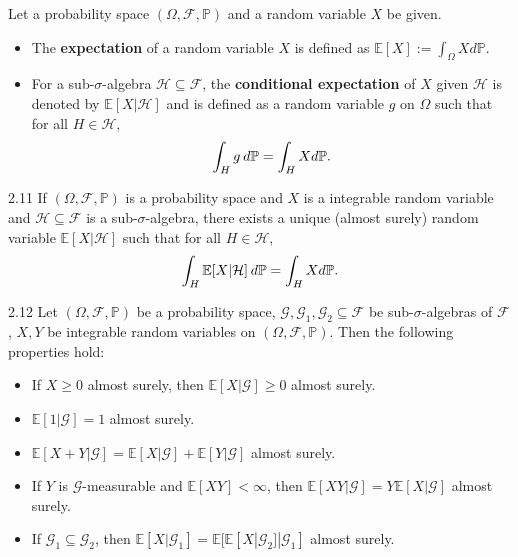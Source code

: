 \documentclass[10pt]{article}
\newenvironment{theorem*}[1]{%
  \IfBlankTF{#1}
    {\renewcommand{\themanualtheoreminner}{\unskip}}
    {\renewcommand\themanualtheoreminner{#1}}%
  \manualtheoreminner
}{\endmanualtheoreminner}
\theoremstyle{definition}
\newenvironment{definition*}[1]{%
  \IfBlankTF{#1}
    {\renewcommand{\themanualdefinitioninner}{\unskip}}
    {\renewcommand\themanualdefinitioninner{#1}}%
  \manualdefinitioninner
}{\endmanualdefinitioninner}
\begin{document}
\begin{definition*}{}Let a probability space $(\Omega, \mathcal{F}, \mathbb{P})$ and a random variable $X$ be given.
    \leavevmode
    \begin{itemize}
        \item The \textbf{expectation} of a random variable $X$ is defined as $\mathbb{E}[X] := \int_{\Omega} X d\mathbb{P}$.
        \item For a sub-$\sigma$-algebra $\mathcal{H} \subseteq \mathcal{F}$, the \textbf{conditional expectation} of $X$ given $\mathcal{H}$ is denoted by $\mathbb{E}[X|\mathcal{H}]$ 
        and is defined as a random variable $g$ on $\Omega$ such that for all $H \in \mathcal{H}$,
        \begin{equation*}
            \int_{H} g \hspace{0.2em} d\mathbb{P} = \int_{H} X d\mathbb{P}.
        \end{equation*}
    \end{itemize}
\end{definition*}

\begin{theorem*}{2.11}
    If $(\Omega, \mathcal{F}, \mathbb{P})$ is a probability space and $X$ is a integrable random variable and $\mathcal{H} \subseteq \mathcal{F}$ is a sub-$\sigma$-algebra, there exists a unique (almost surely) random variable $\mathbb{E}[X|\mathcal{H}]$ such that for all $H \in \mathcal{H}$,
    \begin{equation*}
        \int_{H} \mathbb{E}[X|\mathcal{H}] \hspace{0.2em} d\mathbb{P} = \int_{H} X d\mathbb{P}.
    \end{equation*}
\end{theorem*}

\begin{theorem*}{2.12}
    Let $(\Omega, \mathcal{F}, \mathbb{P})$ be a probability space, 
    $\mathcal{G}, \mathcal{G}_1, \mathcal{G}_2 \subseteq \mathcal{F}$ be sub-$\sigma$-algebras of $\mathcal{F}$,
    $X, Y$ be integrable random variables on $(\Omega, \mathcal{F}, \mathbb{P})$.
    Then the following properties hold:
    \begin{itemize}
        \item[\text{(1)}] If $X \geq 0$ almost surely, then $\mathbb{E}[X|\mathcal{G}] \geq 0$ almost surely.
        \item[\text{(2)}] $\mathbb{E}[1|\mathcal{G}] = 1$ almost surely.
        \item[\text{(3)}] $\mathbb{E}[X + Y|\mathcal{G}] = \mathbb{E}[X|\mathcal{G}] + \mathbb{E}[Y|\mathcal{G}]$ almost surely.
        \item[\text{(4)}] If $Y$ is $\mathcal{G}$-measurable and $\mathbb{E}[XY] < \infty$, then $\mathbb{E}[XY|\mathcal{G}] = Y \mathbb{E}[X|\mathcal{G}]$ almost surely.
        \item[\text{(5)}] If $\mathcal{G}_1 \subseteq \mathcal{G}_2$, then $\mathbb{E}[X|\mathcal{G}_1] = \mathbb{E}[\mathbb{E}[X|\mathcal{G}_2]|\mathcal{G}_1]$ almost surely.
    \end{itemize}
\end{theorem*}
\end{document}
